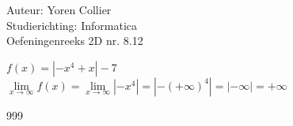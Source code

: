 \documentclass[a4paper]{article}
\newcommand{\Lh}{\left(} %
\newcommand{\Rh}{\right)}
\newcommand{\pnR}{\rightarrow} %
\newcommand{\limiet}{\lim\limits_}
\begin{document}
\noindent \large Auteur: Yoren Collier \\
\noindent \large Studierichting: Informatica\\
\noindent \large Oefeningenreeks 2D nr. 8.12\\

\medskip

\normalsize

$f(x) = \left| -x^4 +x \right| -7 $\\

$\limiet{x \pnR \infty} f(x) = \limiet{x \pnR \infty} \left| -x^4 \right| = \left| -\Lh +\infty \Rh ^4 \right| = \left| -\infty \right| = +\infty$\\

\begin{thebibliography}{999}
\end{thebibliography}
\end{document}
